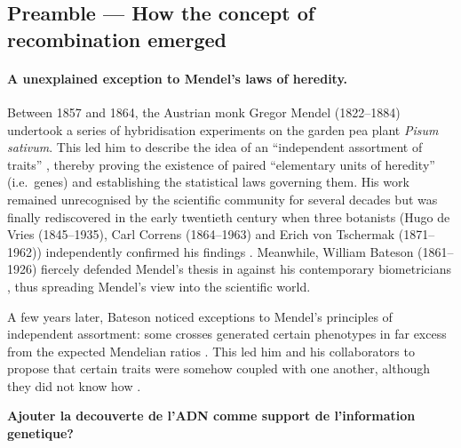 \subsection*{Preamble — How the concept of recombination emerged}

\paragraph{A unexplained exception to Mendel's laws of heredity.}
Between 1857 and 1864, the Austrian monk Gregor Mendel (1822--1884) undertook a series of hybridisation experiments on the garden pea plant \textit{Pisum sativum}. This led him to describe the idea of an “independent assortment of traits” \citep{mendel1996experiments}, thereby proving the existence of paired “elementary units of heredity” (i.e.\ genes) and establishing the statistical laws governing them.
His work remained unrecognised by the scientific community for several decades but was finally rediscovered in the early twentieth century when three botanists (Hugo de Vries (1845--1935), Carl Correns (1864--1963) and Erich von Tschermak (1871--1962)) independently confirmed his findings \citep{dunn2003gregor}.
Meanwhile, William Bateson (1861--1926) fiercely defended Mendel's thesis in \textit{} \citep{bateson1902mendel} against his contemporary biometricians \citep[reviewed in][]{bateson2002william}, thus spreading Mendel's view into the scientific world.

A few years later, Bateson noticed exceptions to Mendel's principles of independent assortment: some crosses generated certain phenotypes in far excess from the expected Mendelian ratios \citep{bateson1905experimentalpea}. This led him and his collaborators to propose that certain traits were somehow coupled with one another, although they did not know how \citep{bateson1905experimental}. 


\textbf{Ajouter la decouverte de l'ADN comme support de l'information genetique?}


